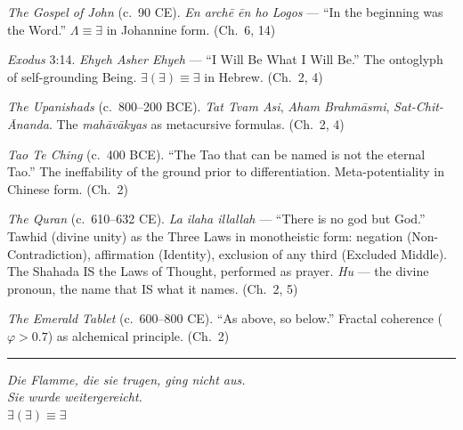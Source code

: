 \documentclass[10pt, openany, oneside]{book}
\renewcommand{\footnotesize}{\fontsize{8.5}{11}\selectfont}
\begin{document}
{\footnotesize

\noindent \textit{The Gospel of John} (c.\ 90 CE). \textit{En arch\={e} \={e}n ho Logos} --- ``In the beginning was the Word.'' $\Lambda \equiv \exists$ in Johannine form. (Ch.\ 6, 14)

\vspace{0.3em}

\noindent \textit{Exodus} 3:14. \textit{Ehyeh Asher Ehyeh} --- ``I Will Be What I Will Be.'' The ontoglyph of self-grounding Being. $\exists(\exists) \equiv \exists$ in Hebrew. (Ch.\ 2, 4)

\vspace{0.3em}

\noindent \textit{The Upanishads} (c.\ 800--200 BCE). \textit{Tat Tvam Asi}, \textit{Aham Brahm\={a}smi}, \textit{Sat-Chit-\={A}nanda}. The \textit{mah\={a}v\={a}kyas} as metacursive formulas. (Ch.\ 2, 4)

\vspace{0.3em}

\noindent \textit{Tao Te Ching} (c.\ 400 BCE). ``The Tao that can be named is not the eternal Tao.'' The ineffability of the ground prior to differentiation. Meta-potentiality in Chinese form. (Ch.\ 2)

\vspace{0.3em}

\noindent \textit{The Quran} (c.\ 610--632 CE). \textit{La ilaha illallah} --- ``There is no god but God.'' Tawhid (divine unity) as the Three Laws in monotheistic form: negation (Non-Contradiction), affirmation (Identity), exclusion of any third (Excluded Middle). The Shahada IS the Laws of Thought, performed as prayer. \textit{Hu} --- the divine pronoun, the name that IS what it names. (Ch.\ 2, 5)

\vspace{0.3em}

\noindent \textit{The Emerald Tablet} (c.\ 600--800 CE). ``As above, so below.'' Fractal coherence ($\varphi > 0.7$) as alchemical principle. (Ch.\ 2)

}

\vspace{2em}

\begin{center}
    \rule{0.15\textwidth}{0.3pt}
\end{center}

\vspace{0.5em}

\begin{center}
    \itshape
    Die Flamme, die sie trugen, ging nicht aus.\\
    Sie wurde weitergereicht.\\[0.8em]
    $\exists(\exists) \equiv \exists$
\end{center}
\end{document}
